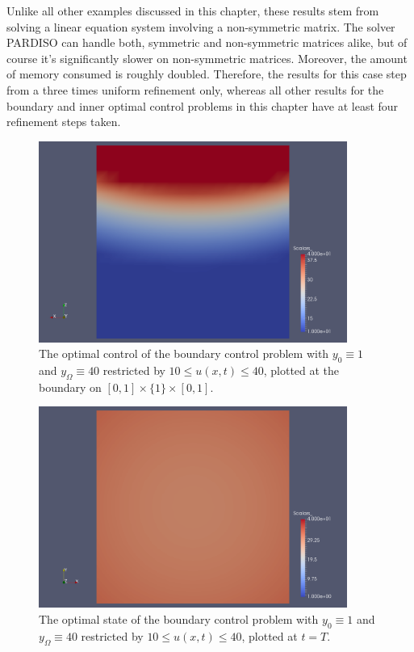 \documentclass[../thesis.tex]{subfiles}
\begin{document}
Unlike all other examples discussed in this chapter, these results stem from solving a linear equation system involving a non-symmetric matrix.
The solver PARDISO can handle both, symmetric and non-symmetric matrices alike, but of course it's significantly slower on non-symmetric matrices. Moreover, the amount of memory consumed is roughly doubled.
Therefore, the results for this case step from a three times uniform refinement only, whereas all other results for the boundary and inner optimal control problems in this chapter have at least four refinement steps taken.
\begin{figure}[htpb]
\centering
\includegraphics[width=0.9\textwidth]{Images/boundary-cont-u-rest.png}
\caption{The optimal control of the boundary control problem with $y_0 \equiv 1$ and $y_\Omega \equiv 40$ restricted by $10 \leq u(x, t) \leq 40$, plotted at the boundary on $[0, 1] \times \{ 1 \} \times [0, 1]$.}
\label{fig:boundary-const-u-rest}
\end{figure}
\begin{figure}[htpb]
\centering
\includegraphics[width=0.9\textwidth]{Images/boundary-cont-y-rest.png}
\caption{The optimal state of the boundary control problem with $y_0 \equiv 1$ and $y_\Omega \equiv 40$ restricted by $10 \leq u(x, t) \leq 40$, plotted at $t = T$.}
\label{fig:boundary-const-y-rest-endtime}
\end{figure}
\FloatBarrier
\end{document}
